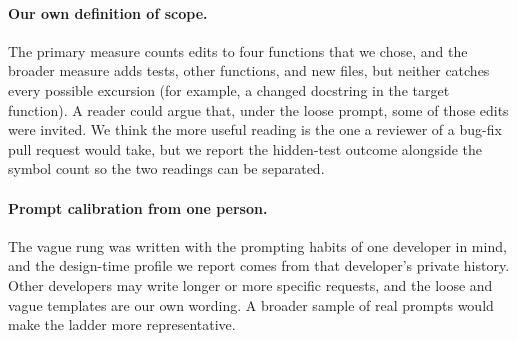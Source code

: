 \paragraph{Our own definition of scope.} The primary measure counts edits to
four functions that we chose, and the broader measure adds tests, other
functions, and new files, but neither catches every possible excursion (for
example, a changed docstring in the target function). A reader could argue that, under the loose
prompt, some of those edits were invited. We think the more useful reading is
the one a reviewer of a bug-fix pull request would take, but we report the
hidden-test outcome alongside the symbol count so the two readings can be
separated.

\paragraph{Prompt calibration from one person.} The vague rung was written with
the prompting habits of one developer in mind, and the design-time profile we
report comes from that developer's private history. Other developers may write longer or
more specific requests, and the loose and vague templates are our own
wording. A broader sample of real prompts would make the ladder more
representative.
